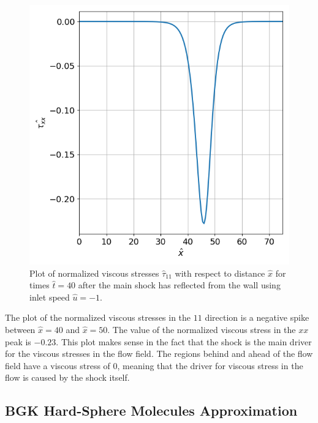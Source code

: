 \documentclass[a4paper]{article}
\begin{document}
\clearpage
\begin{figure}[hbt!]
    \centering
    \includegraphics[width=14cm]{plots/problem_d_tau_xx.png}
    \caption{\centering Plot of normalized viscous stresses $\hat{\tau}_{11}$ with respect to distance $\hat{x}$ for times $\hat{t} = 40$ after the main shock has reflected from the wall using inlet speed $\hat{u} = -1$.}
    \label{problem_d_tau_xx}
\end{figure}
The plot of the normalized viscous stresses in the $11$ direction is a negative spike between $\hat{x} = 40$ and $\hat{x} = 50$. The value of the normalized viscous stress in the $xx$ peak is $-0.23$. This plot makes sense in the fact that the shock is the main driver for the viscous stresses in the flow field. The regions behind and ahead of the flow field have a viscous stress of $0$, meaning that the driver for viscous stress in the flow is caused by the shock itself. 

\clearpage
\subsection{BGK Hard-Sphere Molecules Approximation}
\end{document}
